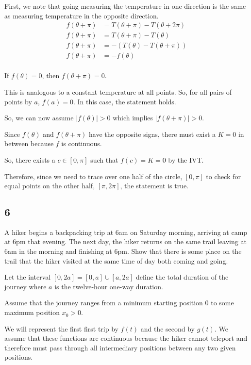 \documentclass[../m134a-hw2.tex]{subfiles}
\begin{document}
First, we note that going measuring the temperature in one direction is the same as measuring temperature in the opposite direction. 
\begin{align*}
    f(\theta + \pi) &= T(\theta + \pi) - T(\theta + 2\pi) \\
    f(\theta + \pi) &= T(\theta + \pi) - T(\theta) \\
    f(\theta + \pi) &= -\left(T(\theta) - T(\theta + \pi)\right) \\
    f(\theta + \pi) &= -f(\theta) \\
\end{align*}

If $f(\theta) = 0$, then $f(\theta + \pi) = 0$.

This is analogous to a constant temperature at all points. So, for all pairs of points by $a$, $f(a) = 0$.
In this case, the statement holds.

So, we can now assume $|f(\theta)| > 0$ which implies $|f(\theta + \pi)| > 0$.

Since $f(\theta)$ and $f(\theta + \pi)$ have the opposite signs, there must exist a $K = 0$ in between because $f$ is continuous.

So, there exists a $c \in [0,\pi]$ such that $f(c) = K = 0$ by the IVT.

Therefore, since we need to trace over one half of the circle, $[0,\pi]$ to check for equal points on the other half, $[\pi,2\pi]$, the statement is true.

\subsection*{6}
A hiker begins a backpacking trip at 6am on Saturday morning, arriving at camp at 6pm that evening. 
The next day, the hiker returns on the same trail leaving at 6am in the morning and finishing at 6pm. 
Show that there is some place on the trail that the hiker visited at the same time of day both coming and going.

Let the interval $[0,2a] = [0,a] \cup [a,2a]$ define the total duration of the journey where $a$ is the twelve-hour one-way duration.

Assume that the journey ranges from a minimum starting position 0 to some maximum position $x_0 > 0$.

We will represent the first first trip by $f(t)$ and the second by $g(t)$.
We assume that these functions are continuous because the hiker cannot teleport and therefore must pass through all intermediary positions between any two given positions.
\end{document}
